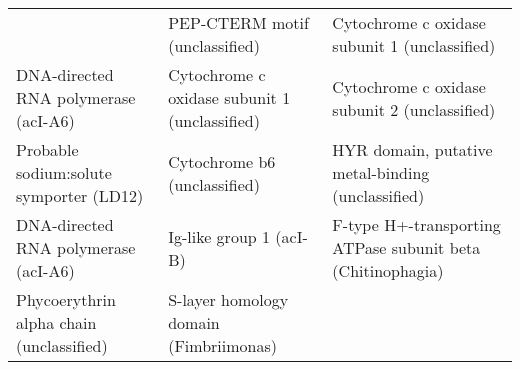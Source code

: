 \documentclass[]{article}
\begin{document}
\begin{longtable}[]{@{}lll@{}}
\begin{minipage}[t]{0.24\columnwidth}
\end{minipage} & \begin{minipage}[t]{0.33\columnwidth}\raggedright\strut
PEP-CTERM motif (unclassified)\strut
\end{minipage} & \begin{minipage}[t]{0.33\columnwidth}\raggedright\strut
Cytochrome c oxidase subunit 1 (unclassified)\strut
\end{minipage}\tabularnewline
\begin{minipage}[t]{0.24\columnwidth}\raggedright\strut
DNA-directed RNA polymerase (acI-A6)\strut
\end{minipage} & \begin{minipage}[t]{0.33\columnwidth}\raggedright\strut
Cytochrome c oxidase subunit 1 (unclassified)\strut
\end{minipage} & \begin{minipage}[t]{0.33\columnwidth}\raggedright\strut
Cytochrome c oxidase subunit 2 (unclassified)\strut
\end{minipage}\tabularnewline
\begin{minipage}[t]{0.24\columnwidth}\raggedright\strut
Probable sodium:solute symporter (LD12)\strut
\end{minipage} & \begin{minipage}[t]{0.33\columnwidth}\raggedright\strut
Cytochrome b6 (unclassified)\strut
\end{minipage} & \begin{minipage}[t]{0.33\columnwidth}\raggedright\strut
HYR domain, putative metal-binding (unclassified)\strut
\end{minipage}\tabularnewline
\begin{minipage}[t]{0.24\columnwidth}\raggedright\strut
DNA-directed RNA polymerase (acI-A6)\strut
\end{minipage} & \begin{minipage}[t]{0.33\columnwidth}\raggedright\strut
Ig-like group 1 (acI-B)\strut
\end{minipage} & \begin{minipage}[t]{0.33\columnwidth}\raggedright\strut
F-type H+-transporting ATPase subunit beta (Chitinophagia)\strut
\end{minipage}\tabularnewline
\begin{minipage}[t]{0.24\columnwidth}\raggedright\strut
Phycoerythrin alpha chain (unclassified)\strut
\end{minipage} & \begin{minipage}[t]{0.33\columnwidth}\raggedright\strut
S-layer homology domain (Fimbriimonas)\strut

\end{minipage}
\end{longtable}
\end{document}
